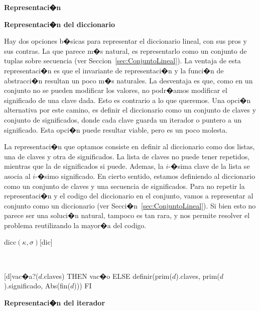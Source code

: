 \documentclass[a4paper,10pt]{article}
\newenvironment{Representacion}{%
  \vspace*{2ex}%
  \noindent\textbf{\Large Representaci�n}%
  \vspace*{2ex}%
}{}
\newcommand{\Titulo}[1]{
  \vspace*{1ex}\par\noindent\textbf{\large #1}\par
}
\begin{document}
\begin{Representacion}
  
  \Titulo{Representaci�n del diccionario}

  Hay dos opciones b�sicas para representar el diccionario lineal, con sus pros y sus contras.  La que parece m�s natural, es representarlo como un conjunto de tuplas sobre secuencia (ver Seccion~\ref{sec:ConjuntoLineal}).  La ventaja de esta representaci�n es que el invariante de representaci�n y la funci�n de abstracci�n resultan un poco m�s naturales.  La desventaja es que, como en un conjunto no se pueden modificar los valores, no podr�amos modificar el significado de una clave dada.  Esto es contrario a lo que queremos.  Una opci�n alternativa por este camino, es definir el diccionario como un conjunto de claves y conjunto de significados, donde cada clave guarda un iterador o puntero a un significado.  Esta opci�n puede resultar viable, pero es un poco molesta.

  La representaci�n que optamos consiste en definir al diccionario como dos listas, una de claves y otra de significados.  La lista de claves no puede tener repetidos, mientras que la de significados si puede.  Ademas, la $i$-�sima clave de la lista se asocia al $i$-�simo significado.  En cierto sentido, estamos definiendo al diccionario como un conjunto de claves y una secuencia de significados.  Para no repetir la representaci�n y el codigo del diccionario en el conjunto, vamos a representar al conjunto como un diccionario (ver Secci�n~\ref{sec:ConjuntoLineal}).  Si bien esto no parece ser una soluci�n natural, tampoco es tan rara, y nos permite resolver el problema reutilizando la mayor�a del codigo.

  \begin{Estructura}{dicc$(\kappa,\sigma)$}[dic]
    \begin{Tupla}[dic]%
    \end{Tupla}
  \end{Estructura}


  ~

  [d]{\IF vac�a?($d$.claves) THEN vac�o ELSE definir(prim($d$).claves, prim($d$).significado, Abs(fin($d$))) FI}

  \Titulo{Representaci�n del iterador}


\end{Representacion}
\end{document}
